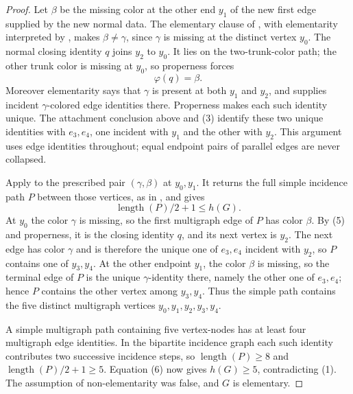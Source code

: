 \begin{proof}
Let $\beta$ be the missing color at the other end $y_1$ of the new first
edge supplied by the new normal data.  The elementary clause of
, with elementarity interpreted by
, makes $\beta\ne\gamma$, since
$\gamma$ is missing at the distinct vertex $y_0$.  The normal closing
identity $q$ joins $y_2$ to $y_0$.  It lies on the two-trunk-color path;
the other trunk color is missing at $y_0$, so properness forces
\[
 \varphi(q)=\beta. \tag{5}
\]
Moreover elementarity says that $\gamma$ is present at both $y_1$ and
$y_2$, and  supplies incident
$\gamma$-colored edge identities there.  Properness makes each such
identity unique.  The attachment conclusion above and (3) identify these
two unique identities with $e_3,e_4$, one incident with $y_1$ and the
other with $y_2$.  This argument uses edge identities throughout; equal
endpoint pairs of parallel edges are never collapsed.

Apply  to the prescribed pair
$(\gamma,\beta)$ at $y_0,y_1$.  It returns the full simple incidence path
$P$ between those vertices, as in
, and gives
\[
 \operatorname{length}(P)/2+1\leq h(G). \tag{6}
\]
At $y_0$ the color $\gamma$ is missing, so the first multigraph edge of
$P$ has color $\beta$.  By (5) and properness, it is the closing identity
$q$, and its next vertex is $y_2$.  The next edge has color $\gamma$ and
is therefore the unique one of $e_3,e_4$ incident with $y_2$, so $P$
contains one of $y_3,y_4$.  At the other endpoint $y_1$, the color
$\beta$ is missing, so the terminal edge of $P$ is the unique
$\gamma$-identity there, namely the other one of $e_3,e_4$; hence $P$
contains the other vertex among $y_3,y_4$.  Thus the simple path contains
the five distinct multigraph vertices
$y_0,y_1,y_2,y_3,y_4$.

A simple multigraph path containing five vertex-nodes has at least four
multigraph edge identities.  In the bipartite incidence graph each such
identity contributes two successive incidence steps, so
$\operatorname{length}(P)\geq8$ and
$\operatorname{length}(P)/2+1\geq5$.  Equation (6) now gives
$h(G)\geq5$, contradicting (1).  The assumption of non-elementarity was
false, and $G$ is elementary.
\end{proof}
